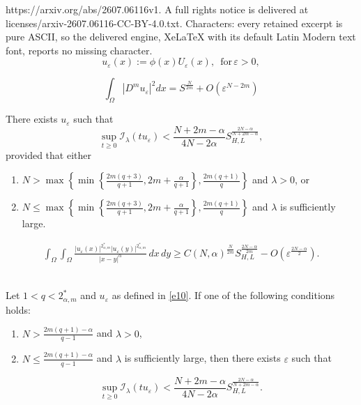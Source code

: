 \documentclass[10pt,a4paper]{amsart}
\newcommand{\DD} {\displaystyle}
\newcommand{\Om}{\Omega}
\newcommand{\al} {\alpha}
\newcommand{\eps}{\varepsilon}
\newcommand{\la} {\lambda}
\newcommand{\mc} {\mathcal}
\begin{document}
https://arxiv.org/abs/2607.06116v1. A full rights notice is delivered at licenses/arxiv-2607.06116-CC-BY-4.0.txt. Characters: every retained excerpt is pure ASCII, so the delivered engine, XeLaTeX with its default Latin Modern text font, reports no missing character.
\begin{equation}\label{e10}
u_\eps(x) :=\phi(x) U_\eps(x), \,  \text{ for} \, \eps>0,
\end{equation} 

\begin{equation} \label{e11}
\DD\int_{\Om}\left|D^m u_{\eps}\right|^2 dx = S^{\frac{N}{2m}}+O\left(\eps^{N-2m}\right)
\end{equation}

\begin{lemma}\label{l5}
There exists $u_{\eps}$ such that
\[\sup _{t \geq 0} \mc{I_\la}(t u_\eps)<\frac{N+2m-\al}{4N-2\al} S_{H, L}^{\frac{2N-\al}{N+2m-\al}},\]
provided that either
\begin{enumerate}
\item  $N>\max \left\{\min \left\{\frac{2m(q+3)}{q+1}, 2m+\frac{\al}{q+1}\right\}, \frac{2m(q+1)}{q}\right\}$ and $\la>0$, or
\item  $N \leq \max \left\{\min \left\{\frac{2m(q+3)}{q+1}, 2m+\frac{\al}{q+1}\right\}, \frac{2m(q+1)}{q}\right\}$ and $\la$ is sufficiently large.
\end{enumerate}
\end{lemma}

\begin{align}\label{e12}
\int_{\Om} \int_{\Om} \frac{\left|u_{\eps}(x)\right|^{2_{\al, m}^*}\left|u_{\eps}(y)\right|^{2_{\al, m}^*}}{|x-y|^\al} \, dx \, dy \geq C(N, \al)^{\frac{N}{2m}} S_{H, L}^{\frac{2N-\al}{2m}}-O\left(\eps^{\frac{2N-\al}{2}}\right).
\end{align}\\

\begin{lemma} \label{l9}
Let $1<q<2_{\al,m}^*$ and $u_{\eps}$ as defined in \eqref{e10}. If one of the following conditions holds:
\begin{enumerate}
\item $N>\frac{2m(q+1)-\al}{q-1}$ and $\la>0$,
\item $N \leq \frac{2m(q+1)-\al}{q-1}$ and $\la$ is sufficiently large,
then there exists $\eps$ such that 
\end{enumerate}
\[\sup _{t \geq 0} \mc{I_\la}\left(t u_{\eps}\right)<\frac{N+2m-\al}{4 N-2\al} S_{H, L}^{\frac{2N-\al}{N+2m-\al}}.\]
\end{lemma}
\end{document}
